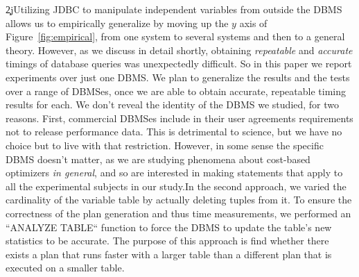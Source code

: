 \c2j{Utilizing JDBC to manipulate independent variables from outside the
  DBMS allows us to empirically generalize by moving up the $y$ axis of
  Figure~\ref{fig:empirical}, from one system to several systems and then to
  a general theory. However, as we discuss in detail shortly, obtaining {\em
    repeatable} and {\em accurate} timings of database queries was
  unexpectedly difficult. So in this paper we report experiments over just
  one DBMS. We plan to generalize the results and the tests over a range of
  DBMSes, once we are able to obtain accurate, repeatable timing results for
  each. We don't reveal the identity of the DBMS we studied, for two reasons. First, commercial DBMSes
include in their user agreements requirements not to release 
performance data. This is detrimental to science, but we have no choice but
to live with that restriction. However, in some sense the specific DBMS
doesn't matter, as we are studying phenomena about cost-based optimizers
{\em in general}, and so are interested in making statements that apply to
all the experimental subjects in our study.}{In the second approach, we varied the cardinality of the variable
  table by actually deleting tuples from it. To ensure the correctness of
  the plan generation and thus time measurements, we performed an ``ANALYZE
  TABLE`` function to force the DBMS to update the table's new statistics to
  be accurate. The purpose of this approach is find whether there exists a
  plan that runs faster with a larger table than a different plan that is
  executed on a smaller table.}

